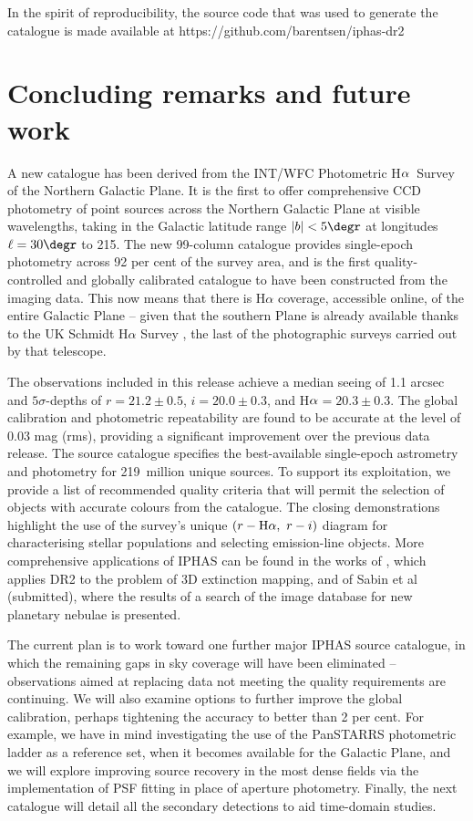 \documentclass[a4paper,useAMS,usenatbib]{mn2e}
\def\ha{\mbox{H$\rm \alpha$}}
\begin{document}
In the spirit of reproducibility,
the source code that was used to generate
the catalogue is made available at
https://github.com/barentsen/iphas-dr2

\vspace{0.5cm}

\section{Concluding remarks and future work}
\label{sec:conclusions}

A new catalogue has been
derived from the INT/WFC Photometric \ha\ Survey
of the Northern Galactic Plane.
It is the first to offer comprehensive CCD photometry
of point sources across the Northern Galactic Plane at visible wavelengths,
taking in the Galactic latitude range $|b|<5\degr$
at longitudes $\ell=30\degr$ to 215\degr.
The new 99-column catalogue provides single-epoch photometry
across 92 per cent of the survey area,
and is the first quality-controlled and globally calibrated
catalogue to have been constructed from the imaging data.  This
now means that there is H$\alpha$ coverage, accessible online,
of the entire Galactic Plane -- given that the 
southern Plane is already available thanks to the UK
Schmidt H$\alpha$ Survey \citep[SHS,][]{Parker2005}, the last of the 
photographic surveys carried out by that telescope.

The observations included in this release
achieve a median seeing of 1.1 arcsec
and $5\sigma$-depths of $r=21.2\pm 0.5$, $i=20.0\pm 0.3$, and \ha$=20.3\pm 0.3$.
The global calibration and photometric repeatability
are found to be accurate at the level of $0.03$ mag (rms),
providing a significant improvement over the 
previous data release.
The source catalogue specifies the best-available
single-epoch astrometry and photometry
for 219~million unique sources.
To support its exploitation, we provide a list of recommended quality criteria
that will permit the selection of objects with accurate colours from 
the catalogue.  The closing demonstrations highlight the use of the 
survey's unique $(r-\ha,\ r-i)$ diagram for characterising stellar populations
and selecting emission-line objects.  More comprehensive applications of IPHAS
can be found in the works of \citet{Sale2014}, which applies DR2 to the problem
of 3D extinction mapping, and of Sabin et al (submitted), where the results of a search
of the image database for new planetary nebulae is presented. 

The current plan is to work toward
one further major IPHAS source catalogue,
in which the remaining gaps in sky coverage
will have been eliminated
-- observations aimed at replacing data
not meeting the quality requirements are continuing.
We will also examine options to further improve
the global calibration,
perhaps tightening the accuracy to better than 2 per cent.
For example, we have in mind investigating
the use of the PanSTARRS photometric ladder \citep{Magnier2013}
as a reference set,
when it becomes available for the Galactic Plane, and we will 
explore improving source recovery in 
the most dense fields via the implementation of PSF fitting
in place of aperture photometry.  
Finally, the next catalogue will detail all the secondary detections
to aid time-domain studies.
\end{document}
